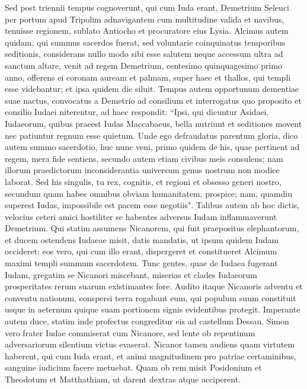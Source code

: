 \begin{biblechapter}  
\verse Sed post triennii tempus cognoverunt, qui cum Iuda erant, Demetrium Seleuci per portum apud Tripolim adnavigantem cum multitudine valida et navibus, 
\verse tenuisse regionem, sublato Antiocho et procuratore eius Lysia. 
\verse Alcimus autem quidam, qui summus sacerdos fuerat, sed voluntarie coinquinatus temporibus seditionis, considerans nullo modo sibi esse salutem neque accessum ultra ad sanctum altare, 
\verse venit ad regem Demetrium, centesimo quinquagesimo primo anno, offerens ei coronam auream et palmam, super haec et thallos, qui templi esse videbantur; et ipsa quidem die siluit. 
\verse Tempus autem opportunum dementiae suae nactus, convocatus a Demetrio ad consilium et interrogatus quo proposito et consilio Iudaei niterentur, 
\verse ad haec respondit: “Ipsi, qui dicuntur Asidaei, Iudaeorum, quibus praeest Iudas Maccabaeus, bella nutriunt et seditiones movent nec patiuntur regnum esse quietum. 
\verse Unde ego defraudatus parentum gloria, dico autem summo sacerdotio, huc nunc veni, 
\verse primo quidem de his, quae pertinent ad regem, mera fide sentiens, secundo autem etiam civibus meis consulens; nam illorum praedictorum inconsiderantia universum genus nostrum non modice laborat. 
\verse Sed his singulis, tu rex, cognitis, et regioni et obsesso generi nostro, secundum quam habes omnibus obviam humanitatem, prospice; 
\verse nam, quamdiu superest Iudas, impossibile est pacem esse negotiis". 
\verse Talibus autem ab hoc dictis, velocius ceteri amici hostiliter se habentes adversus Iudam inflammaverunt Demetrium. 
\verse Qui statim assumens Nicanorem, qui fuit praepositus elephantorum, et ducem ostendens Iudaeae misit, 
\verse datis mandatis, ut ipsum quidem Iudam occideret; eos vero, qui cum illo erant, dispergeret et constitueret Alcimum maximi templi summum sacerdotem. 
\verse Tunc gentes, quae de Iudaea fugerant Iudam, gregatim se Nicanori miscebant, miserias et clades Iudaeorum prosperitates rerum suarum existimantes fore. 
\verse Audito itaque Nicanoris adventu et conventu nationum, conspersi terra rogabant eum, qui populum suum constituit usque in aeternum quique suam portionem signis evidentibus protegit. 
\verse Imperante autem duce, statim inde profectus congreditur eis ad castellum Dessau. 
\verse Simon vero frater Iudae commiserat cum Nicanore, sed lente ob repentinum adversariorum silentium victus evaserat. 
\verse Nicanor tamen audiens quam virtutem haberent, qui cum Iuda erant, et animi magnitudinem pro patriae certaminibus, sanguine iudicium facere metuebat. 
\verse Quam ob rem misit Posidonium et Theodotum et Matthathiam, ut darent dextras atque acciperent. 

\end{biblechapter}

